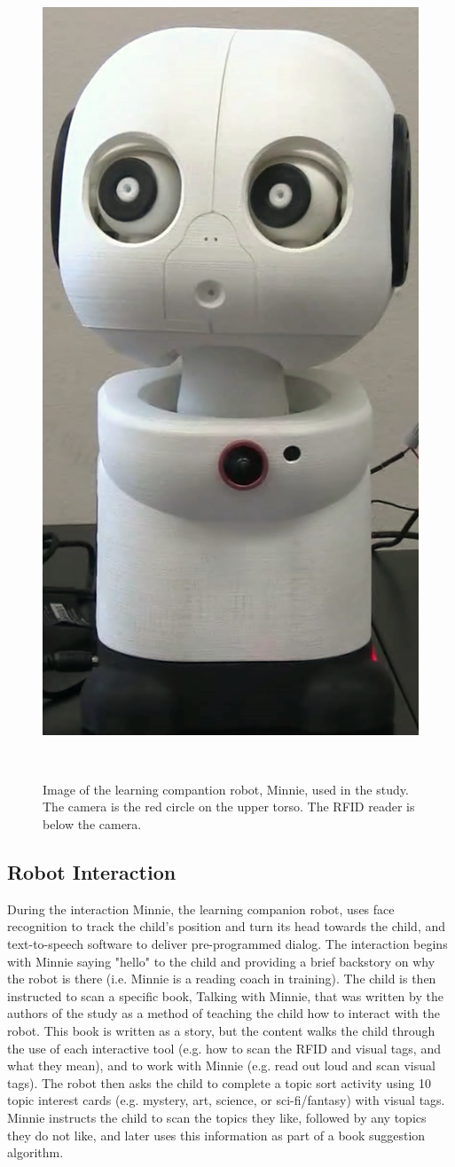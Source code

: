 \documentclass{sigchi}
\begin{document}
\begin{figure}
	\centering
	\includegraphics[width=0.6\columnwidth]{figures/minnie}
	\caption{Image of the learning compantion robot, Minnie, used in the study.  The camera is the red circle on the upper torso.  The RFID reader is below the camera. }~\label{fig:figure1}
\end{figure}

\subsection{Robot Interaction}
During the interaction Minnie, the learning companion robot, uses face recognition to track the child's position and turn its head towards the child, and text-to-speech software to deliver pre-programmed dialog.  The interaction begins with Minnie saying "hello" to the child and providing a brief backstory on why the robot is there (i.e. Minnie is a reading coach in training). The child is then instructed to scan a specific book, Talking with Minnie, that was written by the authors of the study as a method of teaching the child how to interact with the robot.  This book is written as a story, but the content walks the child through the use of each interactive tool (e.g. how to scan the RFID and visual tags, and what they mean), and to work with Minnie (e.g. read out loud and scan visual tags).  The robot then asks the child to complete a topic sort activity using 10 topic interest cards (e.g. mystery, art, science, or sci-fi/fantasy) with visual tags.  Minnie instructs the child to scan the topics they like, followed by any topics they do not like, and later uses this information as part of a book suggestion algorithm.  
\end{document}

